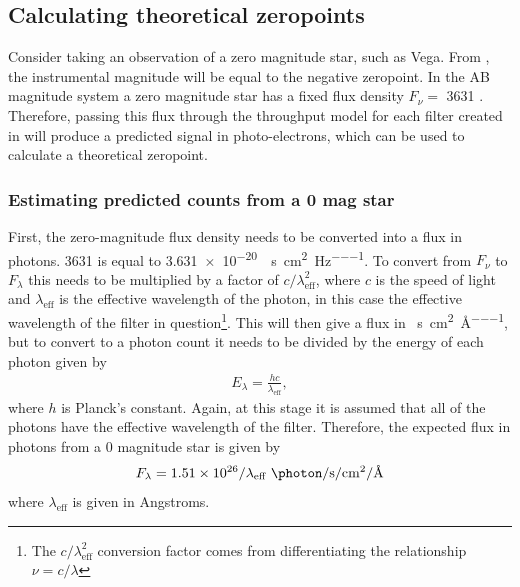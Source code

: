 \subsection{Calculating theoretical zeropoints}
\label{sec:model_zeropoints}
\begin{colsection}

Consider taking an observation of a zero magnitude star, such as Vega. From , the instrumental magnitude will be equal to the negative zeropoint. In the AB magnitude system a zero magnitude star has a fixed flux density $F_\nu = $ \SI{3631}{\jansky} \citep{Sloan_filters}. Therefore, passing this flux through the throughput model for each filter created in  will produce a predicted signal in photo-electrons, which can be used to calculate a theoretical zeropoint.

\subsubsection{Estimating predicted counts from a 0 mag star}

First, the zero-magnitude flux density needs to be converted into a flux in photons. \SI{3631}{\jansky} is equal to \SI{3.631e-20}{\erg\per\second\per\centi\metre\squared\per\hertz}. To convert from $F_\nu$ to $F_\lambda$ this needs to be multiplied by a factor of $c/\lambda_\text{eff}^2$, where $c$ is the speed of light and $\lambda_\text{eff}$ is the effective wavelength of the photon, in this case the effective wavelength of the filter in question\footnote{The $c/\lambda_\text{eff}^2$ conversion factor comes from differentiating the relationship $\nu = c/\lambda$}. This will then give a flux in \si{\erg\per\second\per\centi\metre\squared\per\angstrom}, but to convert to a photon count it needs to be divided by the energy of each photon given by
%
\begin{equation}
    \begin{split}
        E_\lambda = \frac{hc}{\lambda_\text{eff}},
    \end{split}
    \label{eq:photon_energy}
\end{equation}
%
where $h$ is Planck's constant. Again, at this stage it is assumed that all of the photons have the effective wavelength of the filter. Therefore, the expected flux in photons from a 0 magnitude star is given by
%
\begin{equation}
    \begin{split}
        F_\lambda = 1.51 \times 10^{26}/\lambda_\text{eff}~\si{\photon\per\second\per\centi\metre\squared\per\angstrom}
    \end{split}
    \label{eq:zero-mag_photons}
\end{equation}
%
where $\lambda_\text{eff}$ is given in Angstroms.


\end{colsection}
